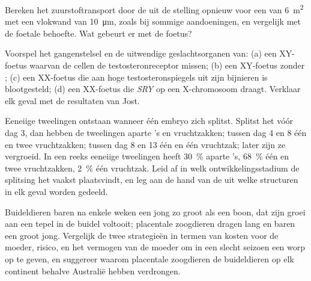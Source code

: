 \begin{exercise}[$\star\star$]\label{exo:b2:mammal-reproduction:9}
Bereken het zuurstoftransport door de  uit de stelling opnieuw voor
een  van \qty{6}{m^2} met een vlokwand van \qty{10}{\micro m}, zoals
bij sommige aandoeningen, en vergelijk met de foetale behoefte. Wat gebeurt
er met de foetus?
\end{exercise}

\begin{exercise}[$\star\star\star$]\label{exo:b2:mammal-reproduction:10}
Voorspel het gangenstelsel en de uitwendige geslachtsorganen van: (a) een
XY-foetus waarvan de cellen de testosteronreceptor missen; (b) een
XY-foetus zonder ; (c) een XX-foetus die aan hoge
testosteronspiegels uit zijn bijnieren is blootgesteld; (d) een XX-foetus
die \emph{SRY} op een X-chromosoom draagt. Verklaar elk geval met de
resultaten van Jost.
\end{exercise}

\begin{exercise}[$\star\star\star$]\label{exo:b2:mammal-reproduction:11}
Eeneiige tweelingen ontstaan wanneer één embryo zich splitst. Splitst het
vóór dag 3, dan hebben de tweelingen aparte 's en vruchtzakken;
tussen dag 4 en 8 één  en twee vruchtzakken; tussen dag 8 en 13
één  en één vruchtzak; later zijn ze vergroeid. In een reeks
eeneiige tweelingen heeft \qty{30}{\%} aparte 's, \qty{68}{\%} één
 en twee vruchtzakken, \qty{2}{\%} één vruchtzak. Leid af in welk
ontwikkelingsstadium de splitsing het vaakst plaatsvindt, en leg aan de
hand van de  uit welke structuren in elk geval worden gedeeld.
\end{exercise}

\begin{exercise}[$\star\star\star$]\label{exo:b2:mammal-reproduction:12}
Buideldieren baren na enkele weken een jong zo groot als een boon, dat
zijn groei aan een tepel in de buidel voltooit; placentale zoogdieren
dragen lang en baren een groot jong. Vergelijk de twee strategieën in
termen van kosten voor de moeder, risico, en het vermogen van de moeder om
in een slecht seizoen een worp op te geven, en suggereer waarom placentale
zoogdieren de buideldieren op elk continent behalve Australië hebben
verdrongen.
\end{exercise}

